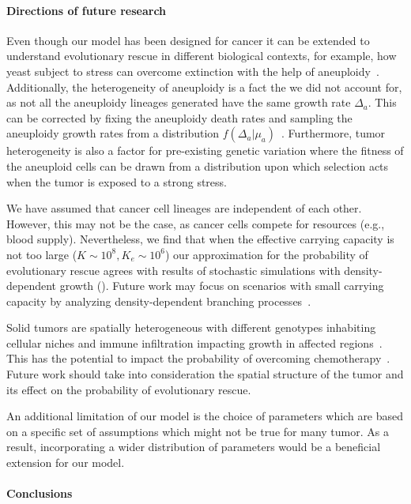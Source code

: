 \documentclass[12pt]{extarticle}
\begin{document}
\paragraph{Directions of future research}
Even though our model has been designed for cancer it can be extended to understand evolutionary rescue in different biological contexts, for example, how yeast subject to stress can overcome extinction with the help of aneuploidy~\citep{pompei2023fitness}. Additionally, the heterogeneity of aneuploidy is a fact the we did not account for, as not all the aneuploidy lineages generated have the same growth rate $\Delta_a$. This can be corrected by  fixing the aneuploidy death rates and sampling the aneuploidy growth rates from a distribution $f\left(\Delta_a|\mu_a\right)$~\citet{martin2013probability}. Furthermore, tumor heterogeneity is also a factor for pre-existing genetic variation where the fitness of the aneuploid cells can be drawn from a distribution upon which selection acts when the tumor is exposed to a strong stress.

We have assumed that cancer cell lineages are independent of each other. However, this may not be the case, as cancer cells compete for resources (e.g., blood supply). Nevertheless, we find that when the effective carrying capacity is not too large ($K\sim10^8, K_e\sim10^6$) 
our approximation for the probability of evolutionary rescue agrees with results of stochastic simulations with density-dependent growth  ().
Future work may focus on scenarios with small carrying capacity by analyzing density-dependent branching processes~\citep{klebaner1997population,harris1963theory}. 

Solid tumors are spatially heterogeneous with different genotypes inhabiting cellular niches and immune infiltration impacting growth in affected regions~\citep{varrone2023cellcharter,galon2010immune}. This has the potential to impact the probability of overcoming chemotherapy~\citep{martens2011spatial}. Future work should take into consideration the spatial structure of the tumor and its effect on the probability of evolutionary rescue.

An additional limitation of our model is the choice of parameters which are based on a specific set of assumptions which might not be true for many tumor. As a result, incorporating a wider distribution of parameters would be a beneficial extension for our model.
\paragraph{Conclusions}
\end{document}

